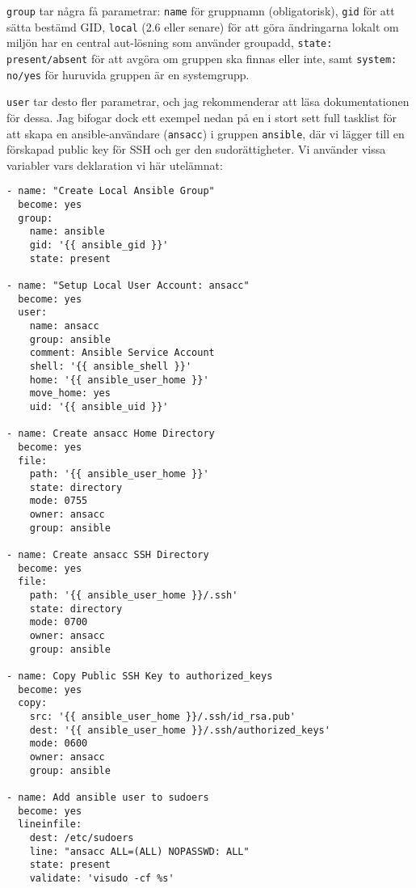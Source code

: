 \texttt{group} tar några få parametrar: \texttt{name} för gruppnamn (obligatorisk), \texttt{gid} för att sätta 
bestämd GID, \texttt{local} (2.6 eller senare) för att göra ändringarna lokalt om miljön har en central aut-lösning 
som använder groupadd, \texttt{state: present/absent} för att avgöra om gruppen ska finnas eller inte, samt 
\texttt{system: no/yes} för huruvida gruppen är en systemgrupp.

\texttt{user} tar desto fler parametrar, och jag rekommenderar att läsa dokumentationen för dessa. Jag bifogar dock
ett exempel nedan på en i stort sett full tasklist för att skapa en ansible-användare (\texttt{ansacc}) i gruppen 
\texttt{ansible}, där vi lägger till en förskapad public key för SSH och ger den sudorättigheter. Vi använder vissa
variabler vars deklaration vi här utelämnat:
\newpage

\begin{verbatim}
- name: "Create Local Ansible Group"
  become: yes
  group:
    name: ansible
    gid: '{{ ansible_gid }}'
    state: present

- name: "Setup Local User Account: ansacc"
  become: yes
  user:
    name: ansacc
    group: ansible
    comment: Ansible Service Account
    shell: '{{ ansible_shell }}'
    home: '{{ ansible_user_home }}'
    move_home: yes
    uid: '{{ ansible_uid }}'

- name: Create ansacc Home Directory
  become: yes
  file:
    path: '{{ ansible_user_home }}'
    state: directory
    mode: 0755
    owner: ansacc
    group: ansible

- name: Create ansacc SSH Directory
  become: yes
  file:
    path: '{{ ansible_user_home }}/.ssh'
    state: directory
    mode: 0700
    owner: ansacc
    group: ansible

- name: Copy Public SSH Key to authorized_keys
  become: yes
  copy:
    src: '{{ ansible_user_home }}/.ssh/id_rsa.pub'
    dest: '{{ ansible_user_home }}/.ssh/authorized_keys'
    mode: 0600
    owner: ansacc
    group: ansible

- name: Add ansible user to sudoers
  become: yes
  lineinfile:
    dest: /etc/sudoers
    line: "ansacc ALL=(ALL) NOPASSWD: ALL"
    state: present
    validate: 'visudo -cf %s'
\end{verbatim}


